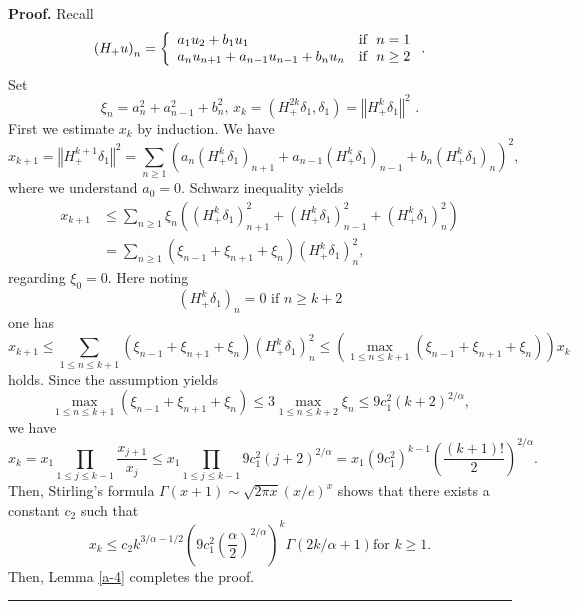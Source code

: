 \documentclass[a4paper]{article}%
\newenvironment{proof}[1][Proof]{\noindent\textbf{#1.} }{\ \rule{0.5em}{0.5em}}
\begin{document}
\begin{proof}
Recall%
\[
\left(  H_{+}u\right)  _{n}=\left\{
\begin{array}
[c]{ll}%
a_{1}u_{2}+b_{1}u_{1} & \text{if \ }n=1\\
a_{n}u_{n+1}+a_{n-1}u_{n-1}+b_{n}u_{n} & \text{if \ }n\geq2
\end{array}
\right.  \text{.}%
\]
Set%
\[
\xi_{n}=a_{n}^{2}+a_{n-1}^{2}+b_{n}^{2}\text{, \ \ }x_{k}=\left(  H_{+}%
^{2k}\delta_{1},\delta_{1}\right)  =\left\Vert H_{+}^{k}\delta_{1}\right\Vert
^{2}\text{\ .}%
\]
First we estimate $x_{k}$ by induction. We have%
\[
x_{k+1}=\left\Vert H_{+}^{k+1}\delta_{1}\right\Vert ^{2}=\sum_{n\geq1}\left(
a_{n}\left(  H_{+}^{k}\delta_{1}\right)  _{n+1}+a_{n-1}\left(  H_{+}^{k}%
\delta_{1}\right)  _{n-1}+b_{n}\left(  H_{+}^{k}\delta_{1}\right)
_{n}\right)  ^{2}\text{,}%
\]
where we understand $a_{0}=0$. Schwarz inequality yields%
\begin{align*}
x_{k+1}  &  \leq\sum_{n\geq1}\xi_{n}\left(  \left(  H_{+}^{k}\delta
_{1}\right)  _{n+1}^{2}+\left(  H_{+}^{k}\delta_{1}\right)  _{n-1}^{2}+\left(
H_{+}^{k}\delta_{1}\right)  _{n}^{2}\right) \\
&  =\sum_{n\geq1}\left(  \xi_{n-1}+\xi_{n+1}+\xi_{n}\right)  \left(  H_{+}%
^{k}\delta_{1}\right)  _{n}^{2}\text{,}%
\end{align*}
regarding $\xi_{0}=0$. Here noting%
\[
\left(  H_{+}^{k}\delta_{1}\right)  _{n}=0\text{ \ if \ }n\geq k+2
\]
one has%
\[
x_{k+1}\leq\sum_{1\leq n\leq k+1}\left(  \xi_{n-1}+\xi_{n+1}+\xi_{n}\right)
\left(  H_{+}^{k}\delta_{1}\right)  _{n}^{2}\leq\left(  \max_{1\leq n\leq
k+1}\left(  \xi_{n-1}+\xi_{n+1}+\xi_{n}\right)  \right)  x_{k}%
\]
holds. Since the assumption yields%
\[
\max_{1\leq n\leq k+1}\left(  \xi_{n-1}+\xi_{n+1}+\xi_{n}\right)  \leq
3\max_{1\leq n\leq k+2}\xi_{n}\leq9c_{1}^{2}\left(  k+2\right)  ^{2/\alpha
}\text{,}%
\]
we have%
\[
x_{k}=x_{1}%
{\displaystyle\prod_{1\leq j\leq k-1}}
\dfrac{x_{j+1}}{x_{j}}\leq x_{1}%
{\displaystyle\prod_{1\leq j\leq k-1}}
9c_{1}^{2}\left(  j+2\right)  ^{2/\alpha}=x_{1}\left(  9c_{1}^{2}\right)
^{k-1}\left(  \dfrac{\left(  k+1\right)  !}{2}\right)  ^{2/\alpha}\text{.}%
\]
Then, Stirling's formula $\Gamma\left(  x+1\right)  \sim\sqrt{2\pi x}\left(
x/e\right)  ^{x}$ shows that there exists a constant $c_{2}$ such that%
\[
x_{k}\leq c_{2}k^{3/\alpha-1/2}\left(  9c_{1}^{2}\left(  \dfrac{\alpha}%
{2}\right)  ^{2/\alpha}\right)  ^{k}\Gamma\left(  2k/\alpha+1\right)  \text{
\ for }k\geq1\text{.}%
\]
Then, Lemma \ref{a-4} completes the proof. \bigskip\ 
\end{proof}
\end{document}
